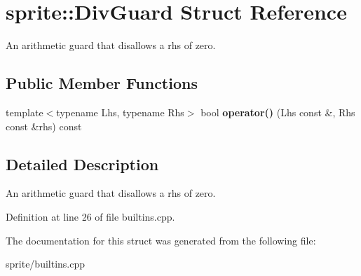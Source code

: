 \section{sprite::Div\-Guard Struct Reference}
\label{structsprite_1_1DivGuard}
An arithmetic guard that disallows a rhs of zero.  


\subsection*{Public Member Functions}
\begin{CompactItemize}
\item 
template$<$typename Lhs, typename Rhs$>$ bool {\bf operator()} (Lhs const \&, Rhs const \&rhs) const \label{structsprite_1_1DivGuard_a1}

\end{CompactItemize}


\subsection{Detailed Description}
An arithmetic guard that disallows a rhs of zero. 



Definition at line 26 of file builtins.cpp.

The documentation for this struct was generated from the following file:\begin{CompactItemize}
\item 
sprite/builtins.cpp\end{CompactItemize}
